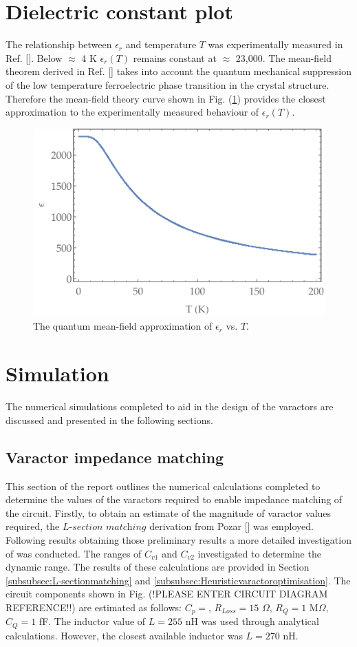 \section{Dielectric constant plot}
\noindent The relationship between $\epsilon_{r}$ and temperature $T$ was experimentally measured in Ref. []. Below $\approx$ 4 K $\epsilon_{r}(T)$ remains constant at $\approx$ 23,000. The mean-field theorem derived in Ref. [] takes into account the quantum mechanical suppression of the low temperature ferroelectric phase transition in the crystal structure. Therefore the mean-field theory curve shown in Fig. (\ref{fig:epsilon_Tplot}) provides the closest approximation to the experimentally measured behaviour of $\epsilon_{r}(T)$.  

\begin{figure}[t]
\centering
\includegraphics[height=0.32\textwidth,keepaspectratio]{epsilon_Tplot}
\caption{\label{fig:epsilon_Tplot}The quantum mean-field approximation of $\epsilon_{r}$ vs. $T$.}
\end{figure}

\section{\label{sec:Simulation}Simulation}
The numerical simulations completed to aid in the design of the varactors are discussed and presented in the following sections. 

\subsection{\label{varactorimpedancematching}Varactor impedance matching}
\noindent This section of the report outlines the numerical calculations completed to determine the values of the varactors required to enable impedance matching of the circuit. Firstly, to obtain an estimate of the magnitude of varactor values required, the $\textit{L-section  matching}$ derivation from Pozar [\citep{pozar2004microwave}] was employed. Following results obtaining those preliminary results a more detailed investigation of was conducted. The ranges of $C_{v1}$ and $C_{v2}$ investigated to determine the dynamic range. The results of these calculations are provided in Section \ref{subsubsec:L-sectionmatching} and \ref{subsubsec:Heuristicvaractoroptimisation}. The circuit components shown in Fig. (!PLEASE ENTER CIRCUIT DIAGRAM REFERENCE!!) are estimated as follows: $C_{p}=$, $R_{Loss}=15$ $\Omega$, $R_{Q}=1$ M$\Omega$, $C_{Q}=1$ fF. The inductor value of $L= 255$ nH was used through analytical calculations. However, the closest available inductor was $L =270$ nH.

